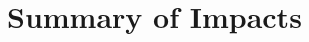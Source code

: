 \section{Summary of Impacts}
\subsection{}
\subsection{}
\subsection{}
\subsection{}
\subsection{}
\subsection{}
\subsection{}
\subsection{}
